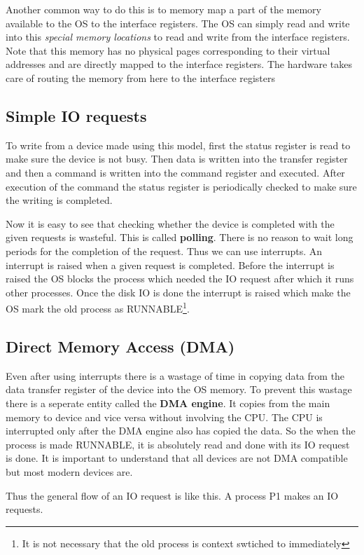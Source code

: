\documentclass[12pt]{article}
\begin{document}
Another common way to do this is 
to memory map a part of the memory available to the OS to the interface registers. The OS can simply read and write into this \textit{special memory locations} to read and write from 
the interface registers. Note that this memory has no physical pages corresponding to their virtual addresses and are directly mapped to the interface registers. The hardware takes care of routing the 
memory from here to the interface registers 

\subsection{Simple IO requests}
To write from a device made using this model, first the status register is read to make sure the device is not busy. 
Then data is written into the transfer register and then a command is written into the command register and executed. After execution of the
command the status register is periodically checked to make sure the writing is completed. 

Now it is easy to see that checking whether the device is completed with the given requests is 
wasteful. This is called \textbf{polling}. There is no reason to wait long periods for the completion of the request. 
Thus we can use interrupts. An interrupt is raised when a given request is completed. Before the interrupt is raised the OS blocks the process which needed the IO request
after which it runs other processes. Once the disk IO is done the interrupt is raised which make the OS mark the old process as RUNNABLE\footnote{It is not necessary that the old process is context swtiched to immediately}.

\subsection{Direct Memory Access (DMA)}
Even after using interrupts there is a wastage of time in copying data from the data transfer register of the device into the OS memory. 
To prevent this wastage there is a seperate entity called the \textbf{DMA engine}. It copies from the main memory to device and vice versa without involving the CPU. 
The CPU is interrupted only after the DMA engine also has copied the data. So the when the process is made RUNNABLE, it is absolutely read and done with its IO request is done. It is important to 
understand that all devices are not DMA compatible but most modern devices are.  


Thus the general flow of an IO request is like this. 
A process P1 makes an IO requests. 
\end{document}
